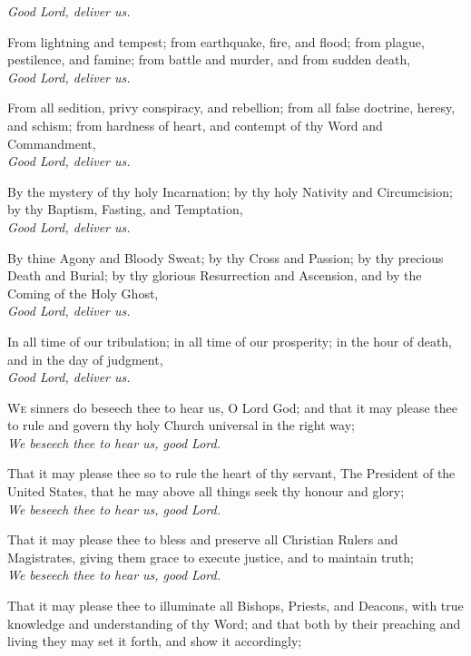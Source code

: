     \textit{Good Lord, deliver us.}
    \par
    From lightning and tempest; from earthquake, fire, and flood; from plague, pestilence, and famine; from battle and murder, and from sudden death,\\
    \textit{Good Lord, deliver us.}
    \par
    From all sedition, privy conspiracy, and rebellion; from all false doctrine, heresy, and schism; from hardness of heart, and contempt of thy Word and Commandment,\\
    \textit{Good Lord, deliver us.}
    \par
    By the mystery of thy holy Incarnation; by thy holy Nativity and Circumcision; by thy Baptism, Fasting, and Temptation,\\
    \textit{Good Lord, deliver us.}
    \par
    By thine Agony and Bloody Sweat; by thy Cross and Passion; by thy precious Death and Burial; by thy glorious Resurrection and Ascension, and by the Coming of the Holy Ghost,\\
    \textit{Good Lord, deliver us.}
    \par
    In all time of our tribulation; in all time of our prosperity; in the hour of death, and in the day of judgment,\\
    \textit{Good Lord, deliver us.}\\
    \par
\textsc{We} sinners do beseech thee to hear us, O Lord God; and that it may please thee to rule and govern thy holy Church universal in the right way;\\
    \textit{We beseech thee to hear us, good Lord.}
    \par
    That it may please thee so to rule the heart of thy servant, The President of the United States, that he may above all things seek thy honour and glory;\\
    \textit{We beseech thee to hear us, good Lord.}
    \par
    That it may please thee to bless and preserve all Christian Rulers and Magistrates, giving them grace to execute justice, and to maintain truth;\\
    \textit{We beseech thee to hear us, good Lord.}
    \par
    That it may please thee to illuminate all Bishops, Priests, and Deacons, with true knowledge and understanding of thy Word; and that both by their preaching and living they may set it forth, and show it accordingly;\\
